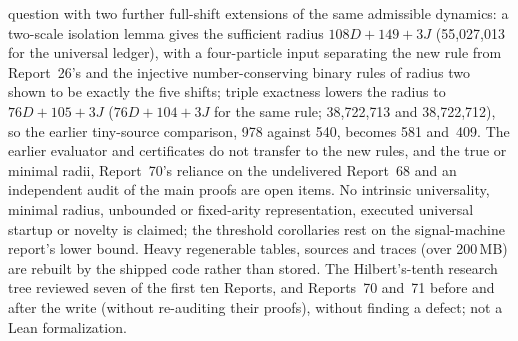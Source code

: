 \documentclass[11pt]{article}
\begin{document}
{question with two further full-shift extensions of the same admissible
dynamics: a two-scale isolation lemma gives the sufficient radius
$108D+149+3J$ (55{,}027{,}013 for the universal ledger), with a
four-particle input separating the new rule from Report~26's and the
injective number-conserving binary rules of radius two shown to be exactly
the five shifts; triple exactness lowers the radius to $76D+105+3J$
($76D+104+3J$ for the same rule; 38{,}722{,}713 and 38{,}722{,}712), so the
earlier tiny-source comparison, 978 against 540, becomes 581 and~409.  The
earlier evaluator and certificates do not transfer to the new rules, and
the true or minimal radii, Report~70's reliance on the undelivered
Report~68 and an independent audit of the main proofs are open items.  No intrinsic universality, minimal radius, unbounded or
fixed-arity representation, executed universal startup or novelty is
claimed; the threshold corollaries rest on the signal-machine report's
lower bound.  Heavy regenerable tables, sources and traces (over
200\,MB) are rebuilt by the shipped code rather than stored.  The Hilbert's-tenth research tree
reviewed seven of the first ten Reports, and Reports~70 and~71 before and
after the write (without re-auditing their proofs), without finding a
defect; not a Lean formalization.}
\end{document}
